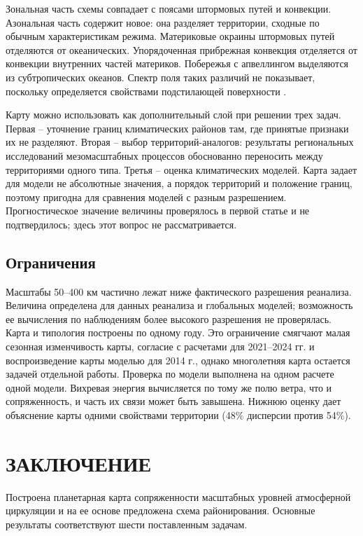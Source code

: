 \documentclass[12pt,a4paper]{article}
\begin{document}
Зональная часть схемы совпадает с поясами штормовых путей и конвекции. Азональная часть содержит новое: она разделяет территории, сходные по обычным характеристикам режима. Материковые окраины штормовых путей отделяются от океанических. Упорядоченная прибрежная конвекция отделяется от конвекции внутренних частей материков. Побережья с апвеллингом выделяются из субтропических океанов. Спектр поля таких различий не показывает, поскольку определяется свойствами подстилающей поверхности \cite{NastromGage1985,Lovejoy2011}.

Карту можно использовать как дополнительный слой при решении трех задач. Первая -- уточнение границ климатических районов там, где принятые признаки их не разделяют. Вторая -- выбор территорий-аналогов: результаты региональных исследований мезомасштабных процессов обоснованно переносить между территориями одного типа. Третья -- оценка климатических моделей. Карта задает для модели не абсолютные значения, а порядок территорий и положение границ, поэтому пригодна для сравнения моделей с разным разрешением. Прогностическое значение величины проверялось в первой статье и не подтвердилось; здесь этот вопрос не рассматривается.

\subsection{Ограничения}

Масштабы 50--400 км частично лежат ниже фактического разрешения реанализа. Величина определена для данных реанализа и глобальных моделей; возможность ее вычисления по наблюдениям более высокого разрешения не проверялась. Карта и типология построены по одному году. Это ограничение смягчают малая сезонная изменчивость карты, согласие с расчетами для 2021--2024 гг. и воспроизведение карты моделью для 2014 г., однако многолетняя карта остается задачей отдельной работы. Проверка по модели выполнена на одном расчете одной модели. Вихревая энергия вычисляется по тому же полю ветра, что и сопряженность, и часть их связи может быть завышена. Нижнюю оценку дает объяснение карты одними свойствами территории (48\% дисперсии против 54\%).

\section{ЗАКЛЮЧЕНИЕ}

Построена планетарная карта сопряженности масштабных уровней атмосферной циркуляции и на ее основе предложена схема районирования. Основные результаты соответствуют шести поставленным задачам.
\end{document}
